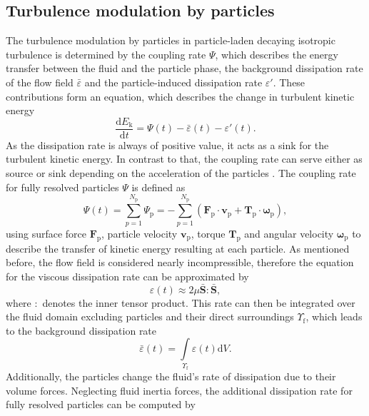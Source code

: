 \documentclass[11pt,a4paper,openany,oneside,parskip=half*]{article}
\renewcommand*\vec[1]{\boldsymbol{#1}}
\begin{document}
\subsection{Turbulence modulation by particles}
The turbulence modulation by particles in  particle-laden decaying isotropic turbulence is determined by the coupling rate $\Psi$, which describes the energy transfer between the fluid and the particle phase, the background dissipation rate of the flow field $\bar{\varepsilon}$ and the particle-induced dissipation rate $\varepsilon'$. These contributions form an equation, which describes the change in turbulent kinetic energy
\begin{equation}
\frac{\mathrm{d} E_\mathrm{k}}{\mathrm{d} t} = \Psi (t) - \bar{\varepsilon} (t) - \varepsilon' (t).
\end{equation}
As the dissipation rate is always of positive value, it acts as a sink for the turbulent kinetic energy. In contrast to that, the coupling rate can serve either as source or sink depending on the acceleration of the particles \cite{Schneiders2017}. The coupling rate for fully resolved particles $\Psi$ is defined as
\begin{equation}
\Psi (t) = \sum_{p=1}^{N_\mathrm{p}} \Psi_\mathrm{p}= - \sum_{p=1}^{N_\mathrm{p}} (\vec{F}_\mathrm{p} \cdot \vec{v}_\mathrm{p} + \vec{T}_\mathrm{p} \cdot \vec{\omega}_\mathrm{p}),
\end{equation}
using surface force $\vec{F}_\mathrm{p}$, particle velocity $\vec{v}_\mathrm{p}$, torque $\vec{T}_\mathrm{p}$ and angular velocity $\vec{\omega}_\mathrm{p}$ to describe the transfer of kinetic energy resulting at each particle. 
\newline
As mentioned before, the flow field is considered nearly incompressible, therefore the equation  for the viscous dissipation rate can be approximated by
\begin{equation}
 \varepsilon (t) \approx 2 \mu \vec{\bar{S}}\vec{:}\vec{\bar{S}},
\end{equation}
where $\vec{:}$ denotes the inner tensor product. This rate can then be integrated over the fluid domain excluding particles and their direct surroundings $\Upsilon_\mathrm{f}$, which leads to the background dissipation rate
\begin{equation}
\bar{\varepsilon} (t) = \int\limits_{\Upsilon_\mathrm{f}} \varepsilon(t) \mathrm{d}V.
\end{equation}
Additionally, the particles change the fluid's rate of dissipation due to their volume forces. Neglecting fluid inertia forces, the additional dissipation rate for fully resolved particles can be computed by
\end{document}
